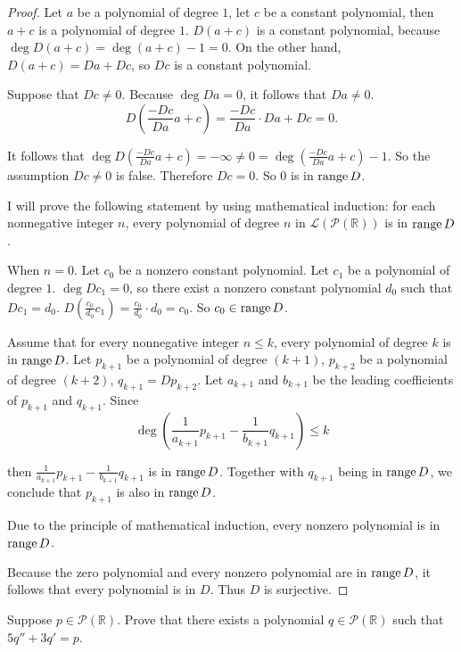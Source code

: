 \begin{proof}
    Let $a$ be a polynomial of degree $1$, let $c$ be a constant polynomial, then $a + c$ is a polynomial of degree $1$. $D(a + c)$ is a constant polynomial, because $\deg D(a+c) = \deg (a + c) - 1 = 0$. On the other hand, $D(a + c) = Da + Dc$, so $Dc$ is a constant polynomial.

    Suppose that $Dc\ne 0$. Because $\deg Da = 0$, it follows that $Da\ne 0$.
    \[
        D\left(\frac{-Dc}{Da}a + c\right) = \frac{-Dc}{Da}\cdot Da + Dc = 0.
    \]

    It follows that $\deg D\left(\frac{-Dc}{Da}a + c\right) = -\infty \ne 0 = \deg\left(\frac{-Dc}{Da}a + c\right) - 1$. So the assumption $Dc\ne 0$ is false. Therefore $Dc = 0$. So $0$ is in $\text{range}\,{D}$.

    I will prove the following statement by using mathematical induction: for each nonnegative integer $n$, every polynomial of degree $n$ in $\mathcal{L}(\mathcal{P}(\mathbb{R}))$ is in $\text{range}\,{D}$.

    When $n = 0$. Let $c_{0}$ be a nonzero constant polynomial. Let $c_{1}$ be a polynomial of degree $1$. $\deg Dc_{1} = 0$, so there exist a nonzero constant polynomial $d_{0}$ such that $Dc_{1} = d_{0}$. $D\left(\frac{c_{0}}{d_{0}}c_{1}\right) = \frac{c_{0}}{d_{0}}\cdot d_{0} = c_{0}$. So $c_{0}\in\text{range}\,{D}$.

    Assume that for every nonnegative integer $n\leq k$, every polynomial of degree $k$ is in $\text{range}\,{D}$. Let $p_{k+1}$ be a polynomial of degree $(k+1)$, $p_{k+2}$ be a polynomial of degree $(k+2)$, $q_{k+1} = Dp_{k+2}$. Let $a_{k+1}$ and $b_{k+1}$ be the leading coefficients of $p_{k+1}$ and $q_{k+1}$. Since
    \[
        \deg\left(\frac{1}{a_{k+1}}p_{k+1} - \frac{1}{b_{k+1}}q_{k+1}\right) \leq k
    \]

    then $\frac{1}{a_{k+1}}p_{k+1} - \frac{1}{b_{k+1}}q_{k+1}$ is in $\text{range}\,{D}$. Together with $q_{k+1}$ being in $\text{range}\,{D}$, we conclude that $p_{k+1}$ is also in $\text{range}\,{D}$.

    Due to the principle of mathematical induction, every nonzero polynomial is in $\text{range}\,{D}$.

    Because the zero polynomial and every nonzero polynomial are in $\text{range}\,{D}$, it follows that every polynomial is in $D$. Thus $D$ is surjective.
\end{proof}
\newpage

\begin{exercise}
    Suppose $p \in \mathcal{P}(\mathbb{R})$. Prove that there exists a polynomial $q \in \mathcal{P}(\mathbb{R})$ such that $5q'' + 3q' = p$.
\end{exercise}

